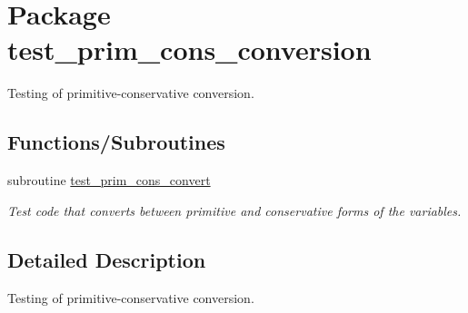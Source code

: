 \hypertarget{a00092}{
\section{Package test\_\-prim\_\-cons\_\-conversion}
\label{a00092}
}
Testing of primitive-conservative conversion.  


\subsection*{Functions/Subroutines}
\begin{CompactItemize}
\item 
\hypertarget{a00092_78d30a19666ba2d201b4bab74b7a927e}{
subroutine \hyperlink{a00092_78d30a19666ba2d201b4bab74b7a927e}{test\_\-prim\_\-cons\_\-convert}}
\label{a00092_78d30a19666ba2d201b4bab74b7a927e}

\begin{CompactList}\small\item\em Test code that converts between primitive and conservative forms of the variables. \item\end{CompactList}\end{CompactItemize}


\subsection{Detailed Description}
Testing of primitive-conservative conversion. 

